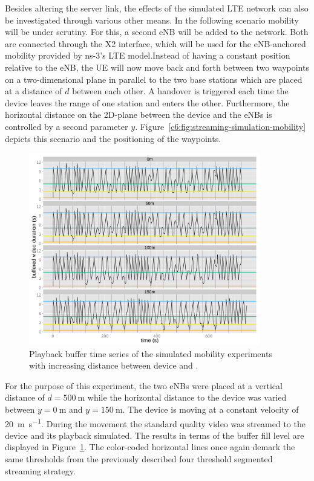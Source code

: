 {Besides altering the server link, the effects of the simulated \gls{LTE} network can also be investigated through various other means. In the following scenario mobility will be under scrutiny. For this, a second \gls{eNB} will be added to the network. Both are connected through the X2 interface, which will be used for the \gls{eNB}-anchored mobility provided by ns-3's \gls{LTE} model.\@ Instead of having a constant position relative to the \gls{eNB}, the \gls{UE} will now move back and forth between two waypoints on a two-dimensional plane in parallel to the two base stations which are placed at a distance of $d$ between each other. A handover is triggered each time the device leaves the range of one station and enters the other. Furthermore, the horizontal distance on the 2D-plane between the device and the \glspl{eNB} is controlled by a second parameter $y$. Figure~\ref{c6:fig:streaming-simulation-mobility} depicts this scenario and the positioning of the waypoints.

\begin{figure}[htb]
	\centering
	\includegraphics[width=0.9\textwidth]{images/R-ltesim-plotbuffer-mobility-facets.pdf}
	\caption{Playback buffer time series of the simulated mobility experiments with increasing distance between device and .}
\label{c6:fig:ltesim-mobility-plotbuffer-facets}
\end{figure}

For the purpose of this experiment, the two \glspl{eNB} were placed at a vertical distance of $d=\SI{500}{\meter}$ while the horizontal distance to the device was varied between $y=\SI{0}{\meter}$ and $y=\SI{150}{\meter}$. The device is moving at a constant velocity of \SI{20}{\meter\per\second}. During the movement the standard quality video was streamed to the device and its playback simulated. The results in terms of the buffer fill level are displayed in Figure~\ref{c6:fig:ltesim-mobility-plotbuffer-facets}. The color-coded horizontal lines once again demark the same thresholds from the previously described four threshold segmented streaming strategy.

}
